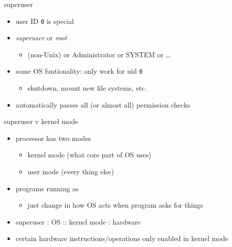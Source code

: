 \begin{frame}{superuser}
\begin{itemize}
\item user ID \texttt{0} is special
\item \textit{superuser} or \textit{root}
    \begin{itemize}
    \item (non-Unix) or Administrator or SYSTEM or \ldots
    \end{itemize}
\vspace{.5cm}
\item some OS funtionality: only work for uid \texttt{0}
    \begin{itemize}
    \item shutdown, mount new file systems, etc.
    \end{itemize}
\item automatically passes all (or almost all) permission checks
\end{itemize}
\end{frame}

\begin{frame}{superuser v kernel mode}
    \begin{itemize}
    \item processor has two modes
	\begin{itemize}
	\item kernel mode (what core part of OS uses)
	\item user mode (every thing else)
	\end{itemize}
    \item programs running as 
        \begin{itemize}
        \item just change in how OS acts when program asks for things
        \end{itemize}
    \vspace{.5cm}
    \item superuser : OS :: kernel mode : hardware
    \vspace{.5cm}
    \item certain hardware instructions/operations only enabled in kernel mode
    \end{itemize}
\end{frame}
